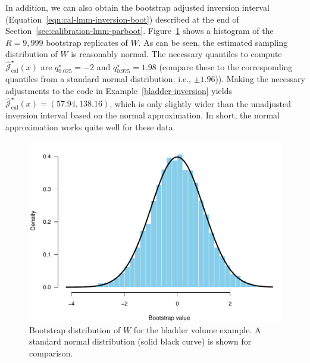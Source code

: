 \documentclass[cmfont,usenames,dvipsnames,leqno]{afit-etd}\usepackage[]{graphicx}\usepackage[]{color}
\makeatletter
\def\maxwidth{ %
  \ifdim\Gin@nat@width>\linewidth
    \linewidth
  \else
    \Gin@nat@width
  \fi
}
\newenvironment{knitrout}{}{} %
\renewenvironment{knitrout}{\begin{singlespace}}{\end{singlespace}}
\newcommand{\boot}{\star} %
\newcommand{\mc}[1]{\ensuremath{\mathcal{#1}}}
\newcommand{\wh}[1]{\ensuremath{\widehat{#1}}}
\makeatother
\begin{document}
In addition, we can also obtain the bootstrap adjusted inversion interval (Equation~\eqref{eqn:cal-lmm-inversion-boot}) described at the end of Section~\ref{sec:calibration-lmm-parboot}.
Figure~\ref{fig:bladder-parboot-hist1} shows a histogram of the $R = 9,999$ bootstrap replicates of $W$. As can be seen, the estimated sampling distribution of $W$ is reasonably normal. The necessary quantiles to compute $\wh{\mc{J}}_\mathrm{cal}^\boot(x)$ are $q_{0.025}^\boot = -2$ and $q_{0.975}^\boot = 1.98$ (compare these to the corresponding quantiles from a standard normal distribution; i.e., $\pm 1.96$)). Making the necessary adjustments to the code in Example~\ref{bladder-inversion} yields $\wh{\mc{J}}_\mathrm{cal}^\boot(x) = (57.94, 138.16)$, which is only slightly wider than the unadjusted inversion interval based on the normal approximation. In short, the normal approximation works quite well for these data.

\begin{knitrout}
\color{fgcolor}\begin{figure}[H]

\includegraphics[width=\maxwidth]{figure/bladder-parboot-hist1} \caption[Bootstrap distribution of $\mc{Q}$ for the bladder volume example]{Bootstrap distribution of $W$ for the bladder volume example. A standard normal distribution (solid black curve) is shown for comparison.\label{fig:bladder-parboot-hist1}}
\end{figure}


\end{knitrout}
\end{document}
